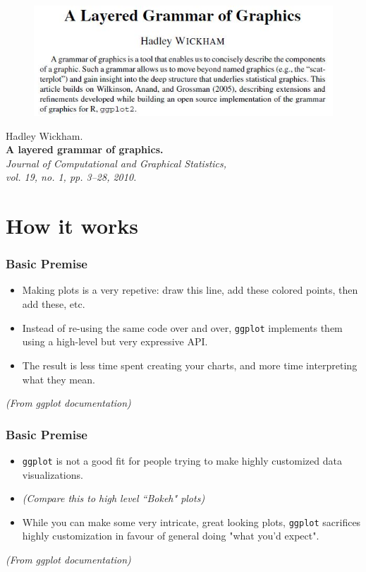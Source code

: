 \documentclass{beamer}
\begin{document}
\begin{frame}

\begin{figure}
\centering
\includegraphics[width=1.1\linewidth]{HWpaper}
\end{figure}
\begin{framed}
Hadley Wickham.\\
\textbf{A layered grammar of graphics.}\\
\textit{Journal of Computational and Graphical Statistics, \\ vol. 19, no. 1, pp. 3–28, 2010.}
\end{framed}

\end{frame}

\section{How it works}
\begin{frame}[fragile]
	\Large
	\frametitle{Basic Premise}
\vspace{-0.7cm}
	\begin{itemize}
		\item Making plots is a very repetive: draw this line, add these colored points, then add these, etc. 
		\item Instead of re-using the same code over and over, \texttt{ggplot} implements them using a high-level but very expressive API.
		\item The result is less time spent creating your charts, and more time interpreting what they mean.
	\end{itemize}
\indent \textit{(From ggplot documentation)}	
\end{frame}

\begin{frame}[fragile]
	\Large
\frametitle{Basic Premise}
\vspace{-0.7cm}
	\begin{itemize}
		\item \texttt{ggplot} is not a good fit for people trying to make highly customized data visualizations. 
		\item \textit{(Compare this to high level ``Bokeh" plots)}
		\item While you can make some very intricate, great looking plots, \texttt{ggplot} sacrifices highly customization in favour of general doing "what you'd expect".
	\end{itemize}
\textit{(From ggplot documentation)}	
\end{frame}
\end{document}
